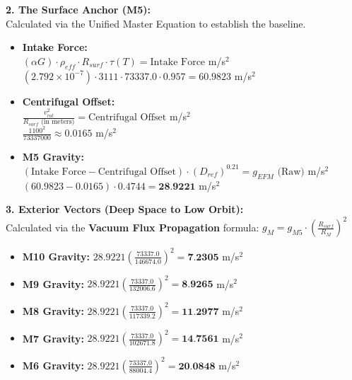 \documentclass[11pt, a4paper]{article}
\begin{document}
  \vspace{1.0em}
  \noindent \textbf{2. The Surface Anchor (M5):} \\
  \hspace*{1em} Calculated via the Unified Master Equation to establish the baseline.
  \begin{itemize}
    \item \textbf{Intake Force:} \\[0.5em]
    \hspace*{2em} $(\alpha G) \cdot \rho_{eff} \cdot R_{surf} \cdot \tau(T) = \text{Intake Force}$ m/s$^2$ \\[1em]
    \hspace*{2em} $(2.792 \times 10^{-7}) \cdot 3111 \cdot 73337.0 \cdot 0.957 = 60.9823$ m/s$^2$
    
    \item \textbf{Centrifugal Offset:} \\[0.5em]
    \hspace*{2em} $\frac{v_{rot}^2}{R_{surf} \text{ (in meters)}} = \text{Centrifugal Offset}$ m/s$^2$ \\[1em]
    \hspace*{2em} $\frac{1100^2}{73337000} \approx 0.0165$ m/s$^2$
    
    \item \textbf{M5 Gravity:} \\[0.5em]
    \hspace*{2em} $(\text{Intake Force} - \text{Centrifugal Offset}) \cdot (D_{ref})^{0.21} = g_{EFM} \text{ (Raw)}$ m/s$^2$ \\[1em]
    \hspace*{2em} $(60.9823 - 0.0165) \cdot 0.4744 = \textbf{28.9221}$ m/s$^2$
  \end{itemize}

  \clearpage
  \noindent \textbf{3. Exterior Vectors (Deep Space to Low Orbit):} \\
  \hspace*{1em} Calculated via the \textbf{Vacuum Flux Propagation} formula: $g_M = g_{M5} \cdot \left( \frac{R_{surf}}{R_M} \right)^2$
  \begin{itemize}
    \item \textbf{M10 Gravity:} $28.9221 \left( \frac{73337.0}{146674.0} \right)^2 = \textbf{7.2305}$ m/s$^2$
    \item \textbf{M9 Gravity:} $28.9221 \left( \frac{73337.0}{132006.6} \right)^2 = \textbf{8.9265}$ m/s$^2$
    \item \textbf{M8 Gravity:} $28.9221 \left( \frac{73337.0}{117339.2} \right)^2 = \textbf{11.2977}$ m/s$^2$
    \item \textbf{M7 Gravity:} $28.9221 \left( \frac{73337.0}{102671.8} \right)^2 = \textbf{14.7561}$ m/s$^2$
    \item \textbf{M6 Gravity:} $28.9221 \left( \frac{73337.0}{88004.4} \right)^2 = \textbf{20.0848}$ m/s$^2$
  \end{itemize}
\end{document}
